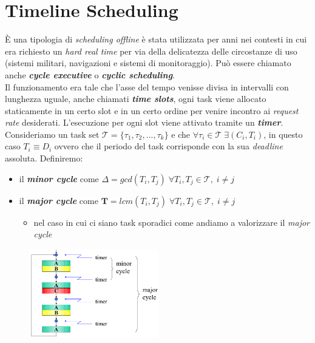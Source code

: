 \section{Timeline Scheduling}
È una tipologia di \textit{scheduling offline} è stata utilizzata per anni nei contesti in cui era richiesto un \textit{hard real time} per via della delicatezza delle circostanze di uso (sistemi militari, navigazioni e sistemi di monitoraggio). Può essere chiamato anche \textbf{\textit{cycle executive}} o \textbf{\textit{cyclic scheduling}}. \\
Il funzionamento era tale che l'asse del tempo venisse divisa in intervalli con lunghezza uguale, anche chiamati \textbf{\textit{time slots}}, ogni task viene allocato staticamente in un certo slot e in un certo ordine per venire incontro ai \textit{request rate} desiderati. L'esecuzione per ogni slot viene attivato tramite un \textbf{\textit{timer}}. Consideriamo un task set $\mathcal{T} = \{\tau_1, \tau_2, ..., \tau_k\}$ e che $\forall \tau_i \in \mathcal{T} \; \exists (C_i, T_i)$, in questo caso $T_i \equiv D_i$ ovvero che il periodo del task corrisponde con la sua \textit{deadline} assoluta. Definiremo:
\begin{itemize}
    \item il \textbf{\textit{minor cycle}} come $\Delta = gcd(T_i, T_j) \; \forall T_i, T_j \in \mathcal{T}, \; i \neq j$
    \item il \textbf{\textit{major cycle}} come $\mathbf{T} = lcm(T_i, T_j) \; \forall T_i, T_j \in \mathcal{T}, \; i \neq j$
    \begin{itemize}
        \item nel caso in cui ci siano task sporadici come andiamo a valorizzare il \textit{major cycle}
    \end{itemize}
\end{itemize}
\begin{figure}[h]
    \centering
    \includegraphics[width=0.5\textwidth]{img/ts}
\end{figure}

